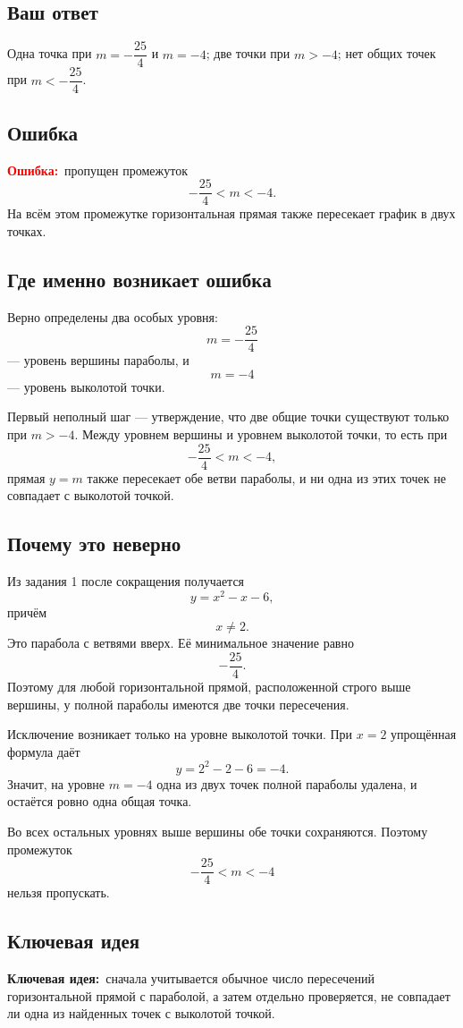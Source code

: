 \documentclass[12pt,a4paper]{article}
\newcommand{\errlabel}{\textcolor{red}{\textbf{Ошибка:}}}
\newcommand{\keyidea}{\textcolor{blue!60!black}{\textbf{Ключевая идея:}}}
\begin{document}
\subsection*{Ваш ответ}
Одна точка при $m=-\dfrac{25}{4}$ и $m=-4$; две точки при $m>-4$; нет общих точек при $m<-\dfrac{25}{4}$.

\subsection*{Ошибка}
\errlabel\ пропущен промежуток
\[
-\frac{25}{4}<m<-4.
\]
На всём этом промежутке горизонтальная прямая также пересекает график в двух точках.

\subsection*{Где именно возникает ошибка}
Верно определены два особых уровня:
\[
m=-\frac{25}{4}
\]
--- уровень вершины параболы, и
\[
m=-4
\]
--- уровень выколотой точки.

Первый неполный шаг --- утверждение, что две общие точки существуют только при $m>-4$. Между уровнем вершины и уровнем выколотой точки, то есть при
\[
-\frac{25}{4}<m<-4,
\]
прямая $y=m$ также пересекает обе ветви параболы, и ни одна из этих точек не совпадает с выколотой точкой.

\subsection*{Почему это неверно}
Из задания 1 после сокращения получается
\[
y=x^2-x-6,
\]
причём
\[
x\ne2.
\]
Это парабола с ветвями вверх. Её минимальное значение равно
\[
-\frac{25}{4}.
\]
Поэтому для любой горизонтальной прямой, расположенной строго выше вершины, у полной параболы имеются две точки пересечения.

Исключение возникает только на уровне выколотой точки. При $x=2$ упрощённая формула даёт
\[
y=2^2-2-6=-4.
\]
Значит, на уровне $m=-4$ одна из двух точек полной параболы удалена, и остаётся ровно одна общая точка.

Во всех остальных уровнях выше вершины обе точки сохраняются. Поэтому промежуток
\[
-\frac{25}{4}<m<-4
\]
нельзя пропускать.

\subsection*{Ключевая идея}
\keyidea\ сначала учитывается обычное число пересечений горизонтальной прямой с параболой, а затем отдельно проверяется, не совпадает ли одна из найденных точек с выколотой точкой.
\end{document}
